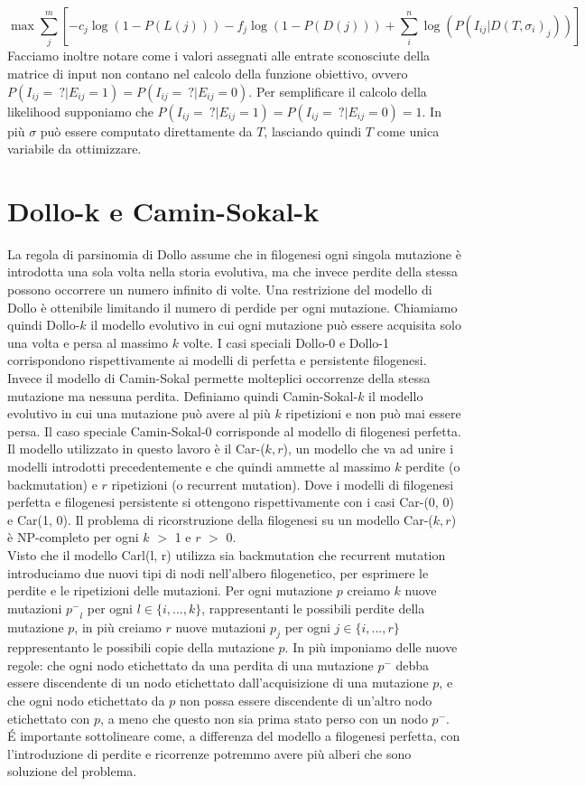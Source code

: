 \documentclass{report}
\begin{document}
  \[
    \max{\sum_{j}^{m}[-c_{j}\log(1-P(L(j)))-f_{j}\log(1-P(D(j)))+\sum_{i}^{n}\log(P(I_{ij}|D(T, \sigma_{i})_{j}))]}
  \]
  Facciamo inoltre notare come i valori assegnati alle entrate sconosciute della matrice di input non contano nel calcolo della funzione obiettivo, ovvero $P(I_{ij}=\ ?|E_{ij}=1)=P(I_{ij}=\ ?|E_{ij}=0)$. Per semplificare il calcolo della likelihood supponiamo che $P(I_{ij}=\ ?|E_{ij}=1)=P(I_{ij}=\ ?|E_{ij}=0)=1$.
  In più $\sigma$ può essere computato direttamente da $T$, lasciando quindi $T$ come unica variabile da ottimizzare.

\section{Dollo-k e Camin-Sokal-k}
  La regola di parsinomia di Dollo assume che in filogenesi ogni singola mutazione è introdotta una sola volta nella storia evolutiva, ma che invece perdite della stessa possono occorrere un numero infinito di volte. Una restrizione del modello di Dollo è ottenibile limitando il numero di perdide per ogni mutazione. Chiamiamo quindi Dollo-$k$ il modello evolutivo in cui ogni mutazione può essere acquisita solo una volta e persa al massimo $k$ volte. I casi speciali Dollo-0 e Dollo-1 corrispondono rispettivamente ai modelli di perfetta e persistente filogenesi.\\
  Invece il modello di Camin-Sokal permette molteplici occorrenze della stessa mutazione ma nessuna perdita. Definiamo quindi Camin-Sokal-$k$ il modello evolutivo in cui una mutazione può avere al più $k$ ripetizioni e non può mai essere persa. Il caso speciale Camin-Sokal-0 corrisponde al modello di filogenesi perfetta.\\
  Il modello utilizzato in questo lavoro è il Car-($k, r$), un modello che va ad unire i modelli introdotti precedentemente e che quindi ammette al massimo $k$ perdite (o backmutation) e $r$ ripetizioni (o recurrent mutation). Dove i modelli di filogenesi perfetta e filogenesi persistente si ottengono rispettivamente con i casi Car-(0, 0) e Car(1, 0). Il problema di ricorstruzione della filogenesi su un modello Car-($k, r$) è NP-completo per ogni $k$ $>$ 1 e $r$ $>$ 0.\\
  Visto che il modello Carl(l, r) utilizza sia backmutation che recurrent mutation introduciamo due nuovi tipi di nodi nell'albero filogenetico, per esprimere le perdite e le ripetizioni delle mutazioni. Per ogni mutazione $p$ creiamo $k$ nuove mutazioni ${p^-}_{l}$ per ogni $l\in\{i, ..., k\}$, rappresentanti le possibili perdite della mutazione $p$, in più creiamo $r$ nuove mutazioni ${p}_{j}$ per ogni $j\in\{i, ..., r\}$ reppresentanto le possibili copie della mutazione $p$.
  In più imponiamo delle nuove regole: che ogni nodo etichettato da una perdita di una mutazione $p^-$ debba essere discendente di un nodo etichettato dall'acquisizione di una mutazione $p$, e che ogni nodo etichettato da $p$ non possa essere discendente di un'altro nodo etichettato con $p$, a meno che questo non sia prima stato perso con un nodo $p^-$.\\
  \'E importante sottolineare come, a differenza del modello a filogenesi perfetta, con l'introduzione di perdite e ricorrenze potremmo avere più alberi che sono soluzione del problema.
\end{document}
